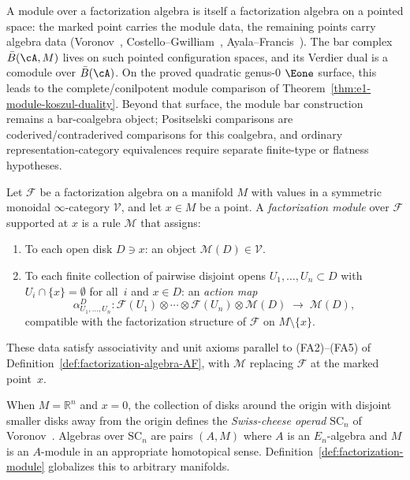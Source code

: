 A module over a factorization algebra is itself a factorization algebra on a pointed space: the marked point carries the module data, the remaining points carry algebra data (Voronov~\cite{Voronov99}, Costello--Gwilliam~\cite{CG17}, Ayala--Francis~\cite{AF15}). The bar complex $\bar{B}(\cA, M)$ lives on such pointed configuration spaces, and its Verdier dual is a comodule over $\bar{B}(\cA)$. On the proved quadratic genus-$0$ $\Eone$ surface, this leads to the complete/conilpotent module comparison of Theorem~\ref{thm:e1-module-koszul-duality}. Beyond that surface, the module bar construction remains a bar-coalgebra object; Positselski comparisons are coderived/contraderived comparisons for this coalgebra, and ordinary representation-category equivalences require separate finite-type or flatness hypotheses.

\begin{definition}\label{def:factorization-module}
Let $\mathcal{F}$ be a factorization algebra on a manifold $M$ with
values in a symmetric monoidal $\infty$-category $\mathcal{V}$, and let
$x \in M$ be a point. A \emph{factorization module} over $\mathcal{F}$
supported at $x$ is a rule $\mathcal{M}$ that assigns:
\begin{enumerate}
\item To each open disk $D \ni x$: an object
 $\mathcal{M}(D) \in \mathcal{V}$.
\item To each finite collection of pairwise disjoint opens
 $U_1, \ldots, U_n \subset D$ with $U_i \cap \{x\} = \emptyset$
 for all~$i$ and $x \in D$: an \emph{action map}
 \[
 \alpha_{U_1,\ldots,U_n}^D:
 \mathcal{F}(U_1) \otimes \cdots \otimes \mathcal{F}(U_n)
 \otimes \mathcal{M}(D)
 \;\longrightarrow\; \mathcal{M}(D),
 \]
 compatible with the factorization structure of $\mathcal{F}$ on
 $M \setminus \{x\}$.
\end{enumerate}
These data satisfy associativity and unit axioms parallel to
(FA2)--(FA5) of Definition~\ref{def:factorization-algebra-AF},
with $\mathcal{M}$ replacing $\mathcal{F}$ at the marked point~$x$.
\end{definition}

\begin{remark}\label{rem:swiss-cheese}
When $M = \mathbb{R}^n$ and $x = 0$, the collection of disks around the
origin with disjoint smaller disks away from the origin defines the
\emph{Swiss-cheese operad} $\mathrm{SC}_n$ of
Voronov~\cite{Voronov99}. Algebras over $\mathrm{SC}_n$ are pairs
$(A, M)$ where $A$ is an $E_n$-algebra and $M$ is an $A$-module in
an appropriate homotopical sense.
Definition~\ref{def:factorization-module} globalizes this to arbitrary manifolds.
\end{remark}

